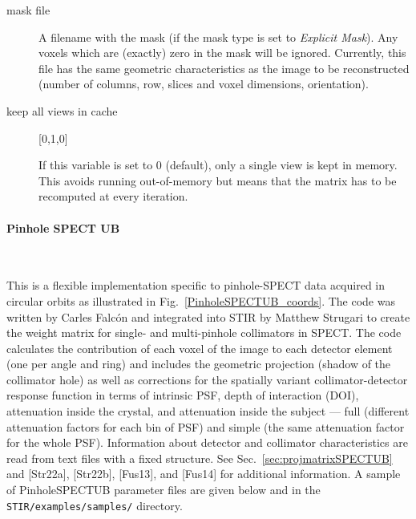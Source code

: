 \documentclass{article}
\newcommand{\subsubsubsection}[1]{\paragraph{#1}\mbox{} \\}
\begin{document}
{{\begin{description}
\item[mask file] \hfill

A filename with the mask (if the mask type is set to \textit{Explicit Mask}). Any voxels which are (exactly) zero in the mask will be ignored. Currently, this file has the same geometric characteristics as the image to be reconstructed (number of columns, row, slices and voxel dimensions, orientation).

\item[keep all views in cache] [0,1,0{]}

If this variable is set to 0 (default), only a single view is kept in memory. This avoids running out-of-memory but means that the matrix has to be recomputed at every iteration.

\end{description}




{ \subsubsubsection{Pinhole SPECT UB} }
\label{sec:projmatrixPinholeSPECTUB}
This is a flexible implementation specific to pinhole-SPECT data acquired in circular orbits as illustrated in Fig.~\ref{PinholeSPECTUB_coords}. The code was written by Carles Falc\'{o}n and  integrated into STIR by Matthew Strugari to create the weight matrix for single- and multi-pinhole collimators in SPECT. The code calculates the contribution of each voxel of the image to each detector element (one per angle and ring) and includes the geometric projection (shadow of the collimator hole) as well as corrections for the spatially variant collimator-detector response function in terms of intrinsic  PSF, depth of interaction (DOI), attenuation inside the crystal, and attenuation inside the subject --- full (different attenuation factors for each bin of PSF) and simple (the same attenuation factor for the whole PSF). Information about detector and collimator characteristics are read from text files with a fixed structure. See Sec.~\ref{sec:projmatrixSPECTUB} and [Str22a], [Str22b], [Fus13], and [Fus14] for additional information. A sample of PinholeSPECTUB parameter files are given below and in the \texttt{STIR/examples/samples/} directory.

}}
\end{document}
